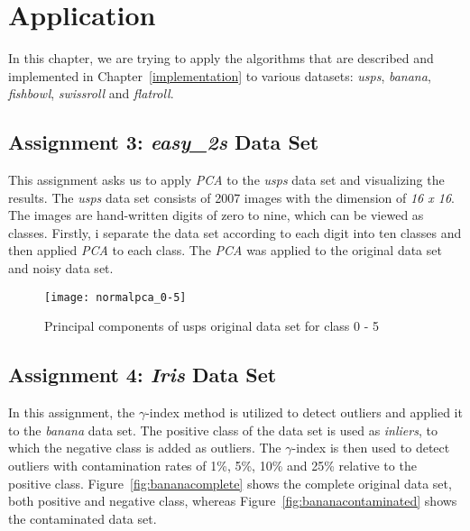 \chapter{Application}
\label{chap:application}

In this chapter, we are trying to apply the algorithms that are described and implemented in Chapter~\ref{implementation} to various datasets: \textit{usps}, \textit{banana}, \textit{fishbowl}, \textit{swissroll} and \textit{flatroll}.


\section{Assignment 3: \textit{easy_2s} Data Set}
\label{assignment3}

This assignment asks us to apply \textit{PCA} to the \textit{usps} data set and visualizing the results. The \textit{usps} data set consists of 2007 images with the dimension of \textit{16 x 16}. The images are hand-written digits of zero to nine, which can be viewed as classes. Firstly, i separate the data set according to each digit into ten classes and then applied \textit{PCA} to each class. The \textit{PCA} was applied to the original data set and noisy data set.

\begin{figure}[h!]
	\centering
	\texttt{[image: normalpca\_0-5]}
	\caption{Principal components of usps original data set for class 0 - 5}
	\label{fig:pcaOriginal05}
\end{figure}


\section{Assignment 4: \textit{Iris} Data Set}
\label{assignment4}

In this assignment, the $\gamma$-index method is utilized to detect outliers and applied it to the \textit{banana} data set. The positive class of the data set is used as \textit{inliers}, to which the negative class is added as outliers. The $\gamma$-index is then used to detect outliers with contamination rates of 1\%, 5\%, 10\% and 25\% relative to the positive class. Figure~\ref{fig:bananacomplete} shows the complete original data set, both positive and negative class, whereas Figure~\ref{fig:bananacontaminated} shows the contaminated data set.

